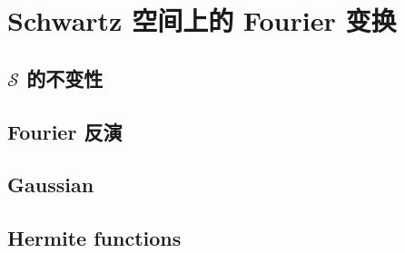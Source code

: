 \section{Schwartz 空间上的 Fourier 变换}
\label{b2:sec:0502}


\subsection{\texorpdfstring{\(\mathcal S\)}{m} 的不变性}
\label{b2:subsec:050201}

\subsection{Fourier 反演}
\label{b2:subsec:050202}

\subsection{Gaussian}
\label{b2:subsec:050203}

\subsection{Hermite functions}
\label{b2:subsec:050204}


